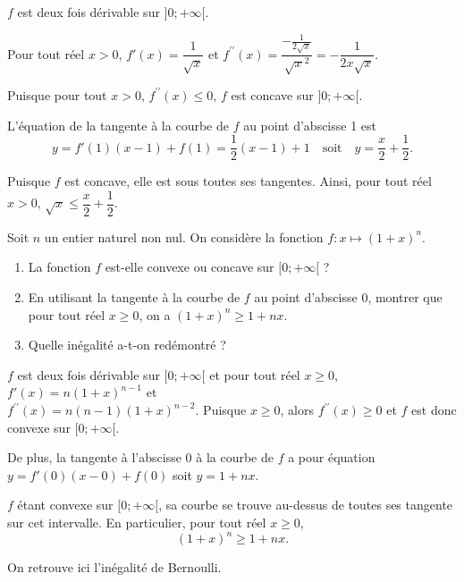 \documentclass[11pt,fleqn, openany]{book} %
\begin{document}
\begin{solution}
\(f\) est deux fois dérivable sur \(]0;+\infty [\).

Pour tout réel \(x>0\), \(f'(x)=\dfrac{1}{\sqrt{x}}\) et $f^{\prime\prime}(x)=\dfrac{-\frac{1}{2\sqrt{x}}}{\sqrt{x}^2}=-\dfrac{1}{2x\sqrt{x}}$.

Puisque pour tout \(x>0\), \(f^{\prime\prime}(x)\leqslant 0\), \(f\) est concave sur \(]0;+\infty[\).

L'équation de la tangente à la courbe de \(f\) au point d'abscisse 1 est
\[ y=f'(1)(x-1)+f(1)=\dfrac{1}{2}(x-1)+1\quad\text{soit}\quad y=\dfrac{x}{2}+\dfrac{1}{2}.\]

 Puisque \(f\) est concave, elle est sous toutes ses tangentes. Ainsi, pour tout réel \(x>0\), \(\sqrt{x} \leqslant \dfrac{x}{2}+\dfrac{1}{2}\).
\end{solution}




\begin{exercise}[topic=cvx03]Soit $n$ un entier naturel non nul. On considère la fonction $f:x\mapsto (1+x)^n$.
\begin{enumerate}
\item La fonction $f$ est-elle convexe ou concave sur $[0;+\infty[$ ?
\item En utilisant la tangente à la courbe de $f$ au point d'abscisse 0, montrer que pour tout réel $x\geqslant 0$,  on a $(1+x)^n \geqslant 1+nx$.
\item Quelle inégalité a-t-on redémontré ?
\end{enumerate}\end{exercise}

\begin{solution}\(f\) est deux fois dérivable sur \([0;+\infty[\) et pour tout réel \(x\geqslant 0\), \(f'(x)=n(1+x)^{n-1}\) et \\ \(f^{\prime\prime}(x)=n(n-1)(1+x)^{n-2}\). Puisque $x\geqslant 0$, alors \(f^{\prime\prime}(x) \geqslant 0\) et \(f\) est donc convexe sur \([0;+\infty[\).

De plus, la tangente à l'abscisse 0 à la courbe de \(f\) a pour équation \(y=f'(0)(x-0)+f(0)\) soit \(y=1+nx\).

\(f\) étant convexe sur \([0;+\infty[\), sa courbe se trouve au-dessus de toutes ses tangente sur cet intervalle. En particulier, pour tout réel \(x\geqslant 0\), 
\[(1+x)^n \geqslant 1+nx .\]

On retrouve ici l'inégalité de Bernoulli.\end{solution}
\end{document}
